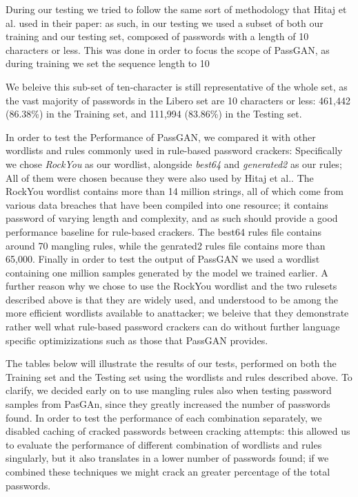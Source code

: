 During our testing we tried to follow the same sort of methodology that Hitaj et al.\cite{PassGAN} used in their paper: as such, in our testing we used a subset of both our training  and our testing set, composed of passwords with a length of 10 characters or less. This was done in order to focus the scope of PassGAN, as during training we set the sequence length to 10 %

We beleive this sub-set of ten-character is still representative of the whole set, as the vast majority of passwords in the Libero set are 10 characters or less: 461,442 (86.38\%) in the Training set, and 111,994 (83.86\%) in the Testing set. 

In order to test the Performance of PassGAN, we compared it with other wordlists and rules commonly used in rule-based password crackers: Specifically we chose \emph{RockYou} as our wordlist, alongside \emph{best64} and \emph{generated2} as our rules; All of them were chosen because they were also used by Hitaj et al.\cite{PassGAN}.
The RockYou wordlist contains more than 14 million strings, all of which come from various data breaches that have been compiled into one resource; it contains password of varying length and complexity, and as such should provide a good performance baseline for rule-based crackers. The best64 rules file contains around 70 mangling rules, while the genrated2 rules file contains more than 65,000. 
Finally in order to test the output of PassGAN we used a wordlist containing one million samples generated by the model we trained earlier.
A further reason why we chose to use the RockYou wordlist and the two rulesets described above is that they are widely used, and understood to be among the more efficient wordlists available to anattacker; we beleive that they demonstrate rather well what rule-based password crackers can do without further language specific optimizizations such as those that PassGAN provides.

The tables below will illustrate the results of our tests, performed on both the Training set and the Testing set using the wordlists and rules described above. To clarify, we decided early on to use mangling rules also when testing password samples from PasGAn, since they greatly increased the number of passwords found. In order to test the performance of each combination separately, we disabled caching of cracked passwords between cracking attempts: this allowed us to evaluate the performance of different combination of wordlists and rules singularly, but it also translates in a lower number of passwords found; if we combined these techniques we might crack an greater percentage of the total passwords.

